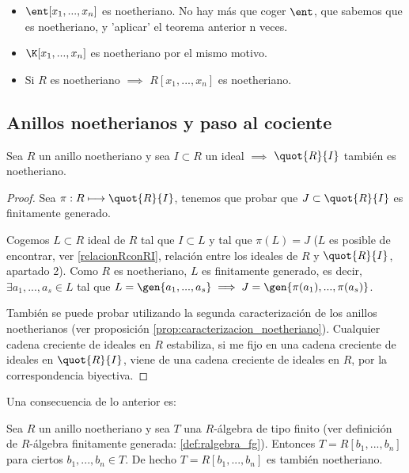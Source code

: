 \begin{example}
	\begin{itemize}
	\item $\ent[x_1,...,x_n]$ es noetheriano. No hay más que coger $\ent$, que sabemos que es noetheriano, y 'aplicar' el teorema anterior n veces.
	\item $\K[x_1,...,x_n]$ es noetheriano por el mismo motivo.
	\item Si $R$ es noetheriano $\implies$ $R[x_1,...,x_n]$ es noetheriano.
	\end{itemize}
\end{example}

\subsection{Anillos noetherianos y paso al cociente}

\begin{prop}
	Sea $R$ un anillo noetheriano y sea $I \subset R$ un ideal $\implies$ $\quot{R}{I}$ también es noetheriano.
\end{prop}
\begin{proof}
	Sea $\pi: R \longmapsto \quot{R}{I}$, tenemos que probar que $J \subset \quot{R}{I}$ es finitamente generado.
	
	Cogemos $L \subset R$ ideal de $R$ tal que $I \subset L$ y tal que $\pi(L)=J$ ($L$ es posible de encontrar, ver \ref{relacionRconRI}, relación entre los ideales de $R$ y $\quot{R}{I}$, apartado 2). Como $R$ es noetheriano, $L$ es finitamente generado, es decir, $\exists a_1,...,a_s \in L$ tal que $L=\gen{a_1,...,a_s} \implies J=\gen{\pi(a_1),...,\pi(a_s)}$.
	
	También se puede probar utilizando la segunda caracterización de los anillos noetherianos (ver proposición \ref{prop:caracterizacion_noetheriano}). Cualquier cadena creciente de ideales en $R$ estabiliza, si me fijo en una cadena creciente de ideales en $\quot{R}{I}$, viene de una cadena creciente de ideales en $R$, por la correspondencia biyectiva.
\end{proof}

Una consecuencia de lo anterior es:

\obs Sea $R$ un anillo noetheriano y sea $T$ una $R$-álgebra de tipo finito (ver definición de $R$-álgebra finitamente generada: \ref{def:ralgebra_fg}). Entonces $T=R[b_1,...,b_n]$ para ciertos $b_1,...,b_n \in T$. De hecho $T=R[b_1,...,b_n]$ es también noetheriano.

